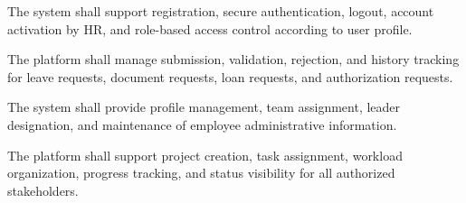 
  {\fontsize{12}{18}\selectfont
  \setlength{\parindent}{1.2cm}
  \setlength{\parskip}{6pt}

  \indent The system shall support registration, secure authentication, logout, account activation by HR, and role-based access control according to user profile.

  }

  \vspace{6pt}


  {\fontsize{12}{18}\selectfont
  \setlength{\parindent}{1.2cm}
  \setlength{\parskip}{6pt}

  \indent The platform shall manage submission, validation, rejection, and history tracking for leave requests, document requests, loan requests, and authorization requests.

  }

  \vspace{6pt}


  {\fontsize{12}{18}\selectfont
  \setlength{\parindent}{1.2cm}
  \setlength{\parskip}{6pt}

  \indent The system shall provide profile management, team assignment, leader designation, and maintenance of employee administrative information.

  }

  \vspace{6pt}


  {\fontsize{12}{18}\selectfont
  \setlength{\parindent}{1.2cm}
  \setlength{\parskip}{6pt}

  \indent The platform shall support project creation, task assignment, workload organization, progress tracking, and status visibility for all authorized stakeholders.

  }

  \vspace{6pt}


